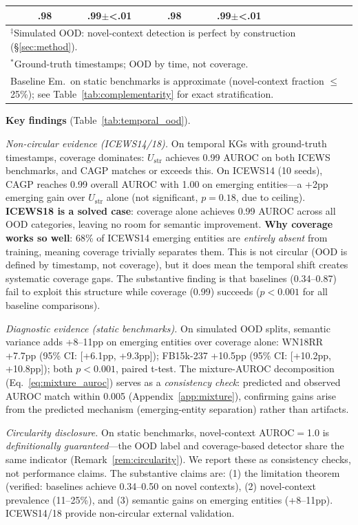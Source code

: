 \begin{table}[t]
{\begin{tabular}{l cc cc cc cc}
           & .98 & .99\tiny{$\pm${\textless}.01}
           & \textbf{.98} & \textbf{.99}\tiny{$\pm${\textless}.01} \\
\bottomrule
\multicolumn{9}{l}{\scriptsize $^\ddagger$Simulated OOD: novel-context detection is perfect by construction (\S\ref{sec:method}).}\\
\multicolumn{9}{l}{\scriptsize $^*$Ground-truth timestamps; OOD by time, not coverage.}\\
\multicolumn{9}{l}{\scriptsize Baseline Em.\ on static benchmarks is approximate (novel-context fraction $\leq$25\%); see Table~\ref{tab:complementarity} for exact stratification.}\\
\end{tabular}}
\end{table}

\textbf{Key findings} (Table~\ref{tab:temporal_ood}).

\emph{Non-circular evidence (ICEWS14/18).} On temporal KGs with ground-truth timestamps, coverage dominates: $U_{\text{str}}$ achieves 0.99 AUROC on both ICEWS benchmarks, and CAGP matches or exceeds this. On ICEWS14 (10 seeds), CAGP reaches 0.99 overall AUROC with 1.00 on emerging entities---a +2pp emerging gain over $U_{\text{str}}$ alone (not significant, $p{=}0.18$, due to ceiling). \textbf{ICEWS18 is a solved case}: coverage alone achieves 0.99 AUROC across all OOD categories, leaving no room for semantic improvement. \textbf{Why coverage works so well}: 68\% of ICEWS14 emerging entities are \emph{entirely absent} from training, meaning coverage trivially separates them. This is not circular (OOD is defined by timestamp, not coverage), but it does mean the temporal shift creates systematic coverage gaps. The substantive finding is that baselines (0.34--0.87) fail to exploit this structure while coverage (0.99) succeeds ($p < 0.001$ for all baseline comparisons).

\emph{Diagnostic evidence (static benchmarks).} On simulated OOD splits, semantic variance adds +8--11pp on emerging entities over coverage alone: WN18RR +7.7pp (95\% CI: [+6.1pp, +9.3pp]); FB15k-237 +10.5pp (95\% CI: [+10.2pp, +10.8pp]); both $p < 0.001$, paired t-test. The mixture-AUROC decomposition (Eq.~\ref{eq:mixture_auroc}) serves as a \emph{consistency check}: predicted and observed AUROC match within 0.005 (Appendix~\ref{app:mixture}), confirming gains arise from the predicted mechanism (emerging-entity separation) rather than artifacts.

\emph{Circularity disclosure.} On static benchmarks, novel-context AUROC$=$1.0 is \emph{definitionally guaranteed}---the OOD label and coverage-based detector share the same indicator (Remark~\ref{rem:circularity}). We report these as consistency checks, not performance claims. The substantive claims are: (1) the limitation theorem (verified: baselines achieve 0.34--0.50 on novel contexts), (2) novel-context prevalence (11--25\%), and (3) semantic gains on emerging entities (+8--11pp). ICEWS14/18 provide non-circular external validation.

